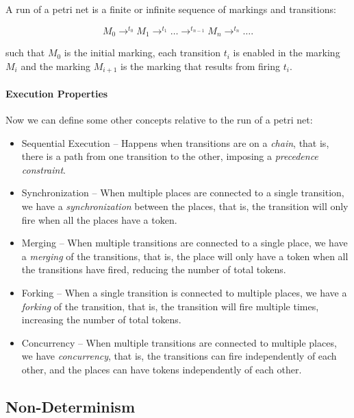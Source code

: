 \documentclass[openright, twoside, twocolumn]{report}
\begin{document}
    \begin{definition}
      \label{def:petri-net-run}

      A run of a petri net is a finite or infinite sequence of markings and transitions:

      \[
        M_0 \to^{ t_0} M_1 \to^{ t_1} \ldots \to^{ t_{n-1} } M_n \to^{ t_n} \ldots
      .\]

      such that $ M_0$ is the initial marking, each transition $ t_i$ is enabled in the marking $M_i$ and the marking $M_{i+1}$ is the marking that results from firing $ t_i$.

    \end{definition}

    \paragraph{Execution Properties}

    Now we can define some other concepts relative to the run of a petri net:

    \begin{itemize}
      \item Sequential Execution -- Happens when transitions are on a \emph{chain}, that is, there is a path from one transition to the other, imposing a \emph{precedence constraint}.
      \item Synchronization -- When multiple places are connected to a single transition, we have a \emph{synchronization} between the places, that is, the transition will only fire when all the places have a token.
      \item Merging -- When multiple transitions are connected to a single place, we have a \emph{merging} of the transitions, that is, the place will only have a token when all the transitions have fired, reducing the number of total tokens.
      \item Forking -- When a single transition is connected to multiple places, we have a \emph{forking} of the transition, that is, the transition will fire multiple times, increasing the number of total tokens.
      \item Concurrency -- When multiple transitions are connected to multiple places, we have \emph{concurrency}, that is, the transitions can fire independently of each other, and the places can have tokens independently of each other.
    \end{itemize}
    \subsection{Non-Determinism}
\end{document}
